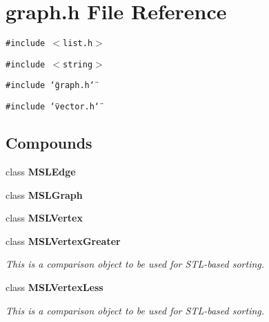 \section{graph.h File Reference}
\label{graph_h}
{\tt \#include $<$list.h$>$}\par
{\tt \#include $<$string$>$}\par
{\tt \#include \char`\"{}graph.h\char`\"{}}\par
{\tt \#include \char`\"{}vector.h\char`\"{}}\par
\subsection*{Compounds}
\begin{CompactItemize}
\item 
class {\bf MSLEdge}
\item 
class {\bf MSLGraph}
\item 
class {\bf MSLVertex}
\item 
class {\bf MSLVertex\-Greater}
\begin{CompactList}\small\item\em This is a comparison object to be used for STL-based sorting.\item\end{CompactList}\item 
class {\bf MSLVertex\-Less}
\begin{CompactList}\small\item\em This is a comparison object to be used for STL-based sorting.\item\end{CompactList}\end{CompactItemize}
